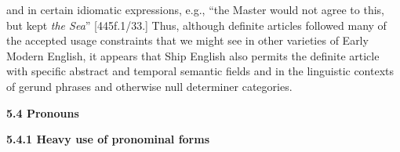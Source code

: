\begin{styleStandard}
 and in certain idiomatic expressions, e.g., “the Master would not agree to this, but kept \textit{the Sea}” [445f.1/33.] Thus, although definite articles followed many of the accepted usage constraints that we might see in other varieties of Early Modern English, it appears that Ship English also permits the definite article with specific abstract and temporal semantic fields and in the linguistic contexts of gerund phrases and otherwise null determiner categories. 
\end{styleStandard}

\begin{styleStandard}
\textbf{5.4 Pronouns}
\end{styleStandard}

\begin{styleStandard}
\textbf{5.4.1 Heavy use of pronominal forms}
\end{styleStandard}

